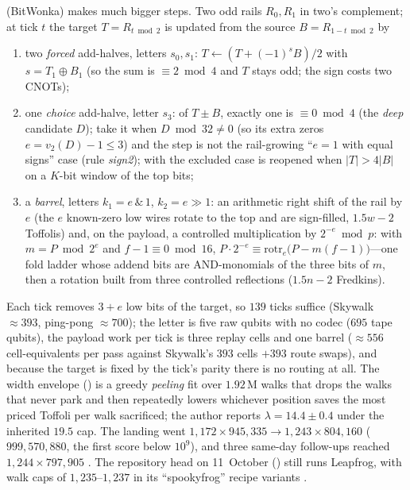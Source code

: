  (BitWonka) makes much bigger steps. Two odd rails $R_0,R_1$ in two's complement; at tick $t$ the target $T=R_{t\bmod2}$ is updated from the source $B=R_{1-t\bmod2}$ by
\begin{enumerate}[nosep]
\item two \emph{forced} add-halves, letters $s_0,s_1$: $T\gets(T+(-1)^sB)/2$ with $s=T_1\oplus B_1$ (so the sum is $\equiv2\bmod4$ and $T$ stays odd; the sign costs two CNOTs);
\item one \emph{choice} add-halve, letter $s_3$: of $T\pm B$, exactly one is $\equiv0\bmod4$ (the \emph{deep} candidate $D$); take it when $D\bmod32\neq0$ (so its extra zeros $e=v_2(D)-1\le3$) and the step is not the rail-growing ``$e=1$ with equal signs'' case (rule \emph{sign2}); with  the excluded case is reopened when $|T|>4|B|$ on a $K$-bit window of the top bits;
\item a \emph{barrel}, letters $k_1=e\,\&\,1$, $k_2=e\gg1$: an arithmetic right shift of the rail by $e$ (the $e$ known-zero low wires rotate to the top and are sign-filled, $1.5w-2$ Toffolis) and, on the payload, a controlled multiplication by $2^{-e}\bmod p$: with $m=P\bmod 2^e$ and $f-1\equiv0\bmod16$, $P\cdot2^{-e}\equiv\mathrm{rotr}_e\big(P-m(f-1)\big)$---one fold ladder whose addend bits are AND-monomials of the three bits of $m$, then a rotation  built from three controlled reflections ($1.5n-2$ Fredkins).
\end{enumerate}
Each tick removes $3+e$ low bits of the target, so $139$ ticks suffice (Skywalk $\approx393$, ping-pong $\approx700$); the letter is five raw qubits with no codec ($695$ tape qubits), the payload work per tick is three replay cells and one barrel ($\approx556$ cell-equivalents per pass against Skywalk's $393$ cells $+393$ route swaps), and because the target is fixed by the tick's parity there is no routing at all. The width envelope () is a greedy \emph{peeling} fit over $1.92$\,M walks that drops the walks that never park and then repeatedly lowers whichever position saves the most priced Toffoli per walk sacrificed; the author reports $\lambda=14.4\pm0.4$ under the inherited $19.5$ cap. The landing went $1{,}172\times945{,}335\to1{,}243\times804{,}160$ ($999{,}570{,}880$, the first score below $10^9$), and three same-day follow-ups reached $1{,}244\times797{,}905$ \cite{ecdsafail-wiki}. The repository head on 11~October () still runs Leapfrog, with walk caps of $1{,}235$--$1{,}237$ in its ``spookyfrog'' recipe variants \cite{ecdsafail-repo}.


